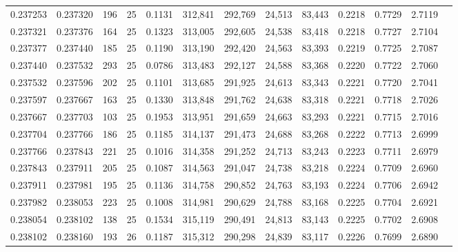 \begin{tabular}{rrrrrrrrrrrrr}
0.237253 & 0.237320 &   196 &  25 &                                     0.1131 & 312,841 & 292,769 &  24,513 &  83,443 & 0.2218 & 0.7729 & 2.7119 \\
0.237321 & 0.237376 &   164 &  25 &                                     0.1323 & 313,005 & 292,605 &  24,538 &  83,418 & 0.2218 & 0.7727 & 2.7104 \\
0.237377 & 0.237440 &   185 &  25 &                                     0.1190 & 313,190 & 292,420 &  24,563 &  83,393 & 0.2219 & 0.7725 & 2.7087 \\
0.237440 & 0.237532 &   293 &  25 &                                     0.0786 & 313,483 & 292,127 &  24,588 &  83,368 & 0.2220 & 0.7722 & 2.7060 \\
0.237532 & 0.237596 &   202 &  25 &                                     0.1101 & 313,685 & 291,925 &  24,613 &  83,343 & 0.2221 & 0.7720 & 2.7041 \\
0.237597 & 0.237667 &   163 &  25 &                                     0.1330 & 313,848 & 291,762 &  24,638 &  83,318 & 0.2221 & 0.7718 & 2.7026 \\
0.237667 & 0.237703 &   103 &  25 &                                     0.1953 & 313,951 & 291,659 &  24,663 &  83,293 & 0.2221 & 0.7715 & 2.7016 \\
0.237704 & 0.237766 &   186 &  25 &                                     0.1185 & 314,137 & 291,473 &  24,688 &  83,268 & 0.2222 & 0.7713 & 2.6999 \\
0.237766 & 0.237843 &   221 &  25 &                                     0.1016 & 314,358 & 291,252 &  24,713 &  83,243 & 0.2223 & 0.7711 & 2.6979 \\
0.237843 & 0.237911 &   205 &  25 &                                     0.1087 & 314,563 & 291,047 &  24,738 &  83,218 & 0.2224 & 0.7709 & 2.6960 \\
0.237911 & 0.237981 &   195 &  25 &                                     0.1136 & 314,758 & 290,852 &  24,763 &  83,193 & 0.2224 & 0.7706 & 2.6942 \\
0.237982 & 0.238053 &   223 &  25 &                                     0.1008 & 314,981 & 290,629 &  24,788 &  83,168 & 0.2225 & 0.7704 & 2.6921 \\
0.238054 & 0.238102 &   138 &  25 &                                     0.1534 & 315,119 & 290,491 &  24,813 &  83,143 & 0.2225 & 0.7702 & 2.6908 \\
0.238102 & 0.238160 &   193 &  26 &                                     0.1187 & 315,312 & 290,298 &  24,839 &  83,117 & 0.2226 & 0.7699 & 2.6890 \\

\end{tabular}
